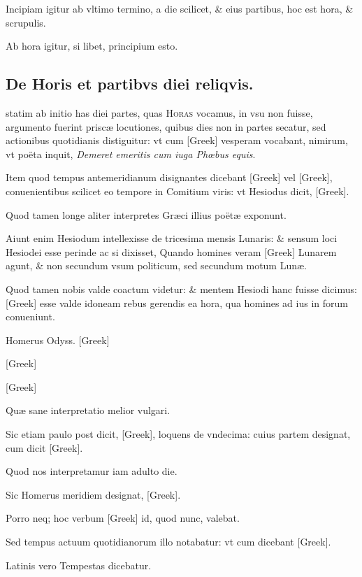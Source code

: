 Incipiam igitur ab vltimo termino, a die scilicet, \& eius partibus,
hoc est hora, \& scrupulis.

Ab hora igitur, si libet, principium esto.


\subsection[De Horis \& partibus diei reliquis.]{De Horis et partibvs diei reliqvis.}

 statim ab initio has diei partes, quas \textsc{Horas}
vocamus, in vsu non fuisse, argumento fuerint priscæ locutiones,
 quibus dies non in partes secatur, sed actionibus quotidianis
distiguitur: vt cum \textgreek{[Greek]} vesperam vocabant, nimirum, vt poëta
inquit, \textit{Demeret emeritis cum iuga Phœbus equis}.

Item quod tempus
antemeridianum disignantes dicebant \textgreek{[Greek]} vel \textgreek{[Greek]},
conuenientibus scilicet eo tempore in Comitium viris: vt Hesiodus dicit,
\textgreek{[Greek]}.

Quod tamen longe aliter interpretes
Græci illius poëtæ exponunt.

Aiunt enim Hesiodum intellexisse
de tricesima mensis Lunaris: \& sensum loci Hesiodei esse perinde
ac si dixisset, Quando homines veram \textgreek{[Greek]} Lunarem agunt, \&
non secundum vsum politicum, sed secundum motum Lunæ.

Quod 
tamen nobis valde coactum videtur: \& mentem Hesiodi hanc fuisse dicimus:
\textgreek{[Greek]} esse valde idoneam rebus gerendis ea hora, qua homines
ad ius in forum conueniunt.

Homerus Odyss. \textgreek{[Greek]}

\textgreek{[Greek]}

\textgreek{[Greek]}

Quæ sane interpretatio melior vulgari.

Sic etiam paulo post dicit,
\textgreek{[Greek]}, loquens de vndecima: cuius partem designat, cum dicit
\textgreek{[Greek]}.

Quod nos interpretamur iam adulto die.

Sic Homerus
meridiem designat, \textgreek{[Greek]}.

Porro neq;
hoc verbum \textgreek{[Greek]} id, quod nunc, valebat.

Sed tempus actuum quotidianorum
illo notabatur: vt cum dicebant \textgreek{[Greek]}.

 Latinis
vero Tempestas dicebatur.

